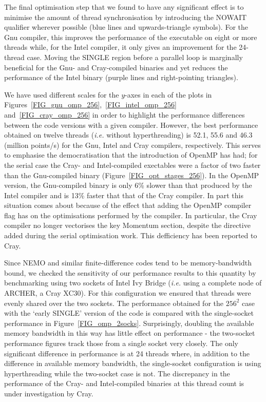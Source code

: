 \documentclass[gmd, manuscript]{copernicus}
\begin{document}
The final optimisation step that we found to have any significant
effect is to minimise the amount of thread synchronisation by
introducing the NOWAIT qualifier wherever possible (blue lines and
upwards-triangle symbols). For the Gnu compiler, this improves the
performance of the executable on eight or more threads while, for the
Intel compiler, it only gives an improvement for the 24-thread
case. Moving the SINGLE region before a parallel loop is marginally
beneficial for the Gnu- and Cray-compiled binaries and yet reduces the
performance of the Intel binary (purple lines and right-pointing
triangles).

We have used different scales for the $y$-axes in each of the plots in
Figures~\ref{FIG_gnu_omp_256},~\ref{FIG_intel_omp_256}
and~\ref{FIG_cray_omp_256} in order to highlight the performance
differences between the code versions with a given compiler. However,
the best performance obtained on twelve threads (\textit{i.e.}  without
hyperthreading) is 52.1, 55.6 and 46.3 (million points/s) for the Gnu,
Intel and Cray compilers, respectively. This serves to emphasise the
democratisation that the introduction of OpenMP has had; for the
serial case the Cray- and Intel-compiled exectables were a factor of
two faster than the Gnu-compiled binary
(Figure~\ref{FIG_opt_stages_256}). In the OpenMP version, the
Gnu-compiled binary is only 6\% slower than that produced by the Intel
compiler and is 13\% faster that that of the Cray compiler. In
part this situation comes about because of the effect that adding the
OpenMP compiler flag has on the optimisations performed by the
compiler.  In particular, the Cray compiler no longer vectorises the
key Momentum section, despite the directive added during the serial
optimisation work. This defficiency has been reported to Cray.

Since NEMO and similar finite-difference codes tend to be
memory-bandwidth bound, we checked the sensitivity of our performance
results to this quantity by benchmarking using two sockets of Intel
Ivy Bridge (\textit{i.e.} using a complete node of ARCHER, a Cray
XC30). For this configuration we ensured that threads were evenly
shared over the two sockets. The performance obtained for the $256^2$
case with the `early SINGLE' version of the code is compared with the
single-socket performance in
Figure~\ref{FIG_omp_2socks}. Surprisingly, doubling the available
memory bandwidth in this way has little effect on performance - the
two-socket performance figures track those from a single socket very
closely. The only significant difference in performance is at 24
threads where, in addition to the difference in available memory
bandwidth, the single-socket configuration is using hyperthreading
while the two-socket case is not.  The discrepancy in the performance
of the Cray- and Intel-compiled binaries at this thread count is under
investigation by Cray.
\end{document}
